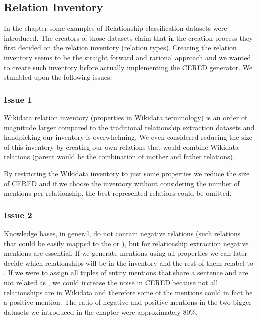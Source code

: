 \subsection{Relation Inventory}
In the  chapter some examples of Relationship classification datasets were introduced. The creators of those datasets claim that in the creation process they first decided on the relation inventory (relation types).  Creating the relation inventory seems to be the straight forward and rational approach and we wanted to create such inventory before actually implementing the CERED generator. We stumbled upon the following issues.

\subsubsection{Issue 1}Wikidata relation inventory (properties in Wikidata terminology) is an order of magnitude larger compared to the traditional relationship extraction datasets and handpicking our inventory is overwhelming. We even considered reducing the size of this inventory by creating our own relations that would combine Wikidata relations (parent would be the combination of mother and father relations). 

By restricting the Wikidata inventory to just some properties we reduce the size of CERED and if we choose the inventory without considering the number of mentions per relationship, the best-represented relations could be omitted.

\subsubsection{Issue 2}Knowledge bases, in general, do not contain negative relations (such relations that could be easily mapped to the  or ), but for relationship extraction negative mentions are essential. If we generate mentions using all properties we can later decide which relationships will be in the inventory and the rest of them relabel to . If we were to assign all tuples of entity mentions that share a sentence and are not related as , we could increase the noise in CERED because not all relationships are in Wikidata and therefore some of the  mentions could in fact be a positive mention. The ratio of negative and positive mentions in the two bigger datasets we introduced in the  chapter were approximately 80\%.

